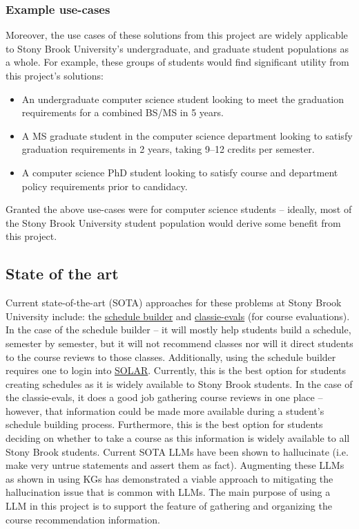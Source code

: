 \documentclass[12pt]{article}
\begin{document}
    \subsubsection{Example use-cases}
    \label{subsubsec:example}
    Moreover, the use cases of these solutions from this project are widely applicable to Stony Brook University's undergraduate, and graduate student populations as a whole. For example, these groups of students would find significant utility from this project's solutions:
    \begin{itemize}
        \item An undergraduate computer science student looking to meet the graduation requirements for a combined BS/MS in 5 years.
        \item A MS graduate student in the computer science department looking to satisfy graduation requirements in 2 years, taking 9--12 credits per semester.
        \item A computer science PhD student looking to satisfy course and department policy requirements prior to candidacy.
    \end{itemize}

    Granted the above use-cases were for computer science students -- ideally, most of the Stony Brook University student population would derive some benefit from this project.

    \subsection{State of the art}
    \label{subsec:sota}
    Current state-of-the-art (SOTA) approaches for these problems at Stony Brook University include: the \href{https://you.stonybrook.edu/uaamedia/schedulebuilder/}{schedule builder} and \href{https://classie-evals.stonybrook.edu/}{classie-evals} (for course evaluations). In the case of the schedule builder -- it will mostly help students build a schedule, semester by semester\cite{sched}, but it will not recommend classes nor will it direct students to the course reviews to those classes. Additionally, using the schedule builder requires one to login into \href{https://it.stonybrook.edu/services/solar}{SOLAR}\cite{sched}. Currently, this is the best option for students creating schedules as it is widely available to Stony Brook students.
    In the case of the classie-evals, it does a good job gathering course reviews in one place\cite{class} -- however, that information could be made more available during a student's schedule building process. Furthermore, this is the best option for students deciding on whether to take a course as this information is widely available to all Stony Brook students.
    Current SOTA LLMs \cite{alpaca,touvron2023llama,touvron2023llama2,ye2023gpt3.5} have been shown to hallucinate (i.e. make very untrue statements and assert them as fact). Augmenting these LLMs as shown in \cite{luo2024} using KGs has demonstrated a viable approach to mitigating the hallucination issue that is common with LLMs. The main purpose of using a LLM in this project is to support the feature of gathering and organizing the course recommendation information.
\end{document}
